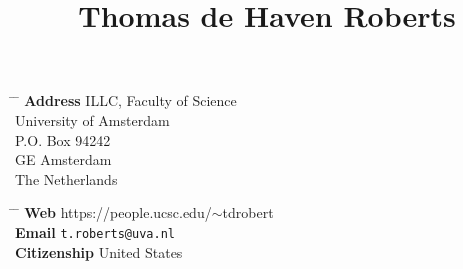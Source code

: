 \documentclass[12pt]{article} %
\begin{document}

\title{Thomas de Haven Roberts} %


\parbox[t][][t]{0.5\textwidth}{ %
\vspace{-0.7cm}
\begin{tabbing} %
\hspace{2.5cm} \= \hspace{4cm} \= \kill %
{\bf Address} \> ILLC, Faculty of Science\\ %
\> University of Amsterdam \\
\> P.O. Box 94242 \\
 GE Amsterdam\\
\> The Netherlands %
\end{tabbing}}
\hfill %
\parbox[t][][t]{0.5\textwidth}{ %
\vspace{-0.7cm}
\begin{tabbing} %
\hspace{2.5cm} \= \hspace{4cm} \= \kill %
{\bf Web} \> https://people.ucsc.edu/$\sim$tdrobert \\ %
{\bf Email} \> \texttt{t.roberts@uva.nl} \\ %
{\bf Citizenship} \> United States
\end{tabbing}}



\end{document}
